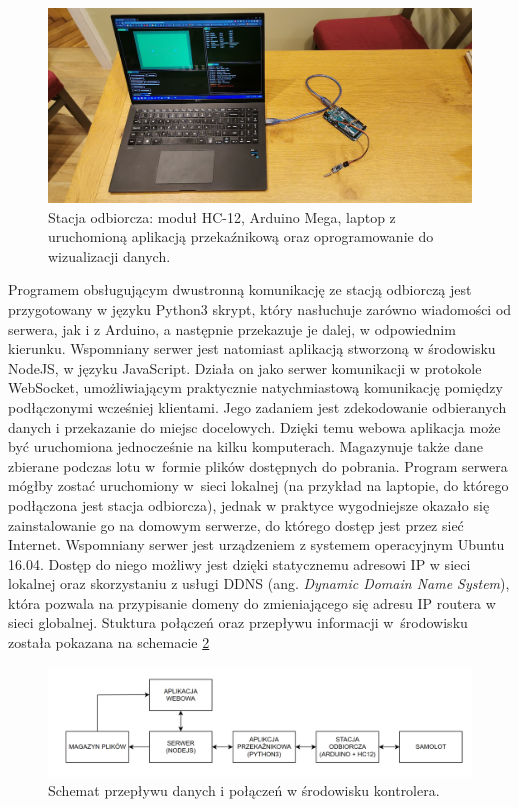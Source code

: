 \documentclass[12pt, a4paper]{article}
\begin{document}
 \begin{figure}[ht]
    \centering
    \includegraphics[width=1\textwidth]{baza}
    \caption{Stacja odbiorcza: moduł HC-12, Arduino Mega, laptop z uruchomioną aplikacją przekaźnikową oraz oprogramowanie do wizualizacji danych.}
    \label{fig:baza}
\end{figure}

Programem obsługującym dwustronną komunikację ze stacją odbiorczą jest przygotowany w języku Python3 skrypt, który nasłuchuje zarówno wiadomości od serwera, jak i z Arduino, a następnie przekazuje je dalej, w odpowiednim kierunku. Wspomniany serwer jest natomiast aplikacją stworzoną w środowisku NodeJS, w języku JavaScript. Działa on jako serwer komunikacji w protokole WebSocket, umożliwiającym praktycznie natychmiastową komunikację pomiędzy podłączonymi wcześniej klientami. Jego zadaniem jest zdekodowanie odbieranych danych i przekazanie do miejsc docelowych. Dzięki temu webowa aplikacja może być uruchomiona jednocześnie na kilku komputerach. Magazynuje także dane zbierane podczas lotu w~formie plików dostępnych do pobrania. Program serwera mógłby zostać uruchomiony w~sieci lokalnej (na przykład na laptopie, do którego podłączona jest stacja odbiorcza), jednak w praktyce wygodniejsze okazało się zainstalowanie go na domowym serwerze, do którego dostęp jest przez sieć Internet. Wspomniany serwer jest urządzeniem z systemem operacyjnym Ubuntu 16.04. Dostęp do niego możliwy jest dzięki statycznemu adresowi IP w sieci lokalnej oraz skorzystaniu z usługi DDNS (ang. \textit{Dynamic Domain Name System}), która pozwala na przypisanie domeny do zmieniającego się adresu IP routera w sieci globalnej. Stuktura połączeń oraz przepływu informacji w~środowisku została pokazana na schemacie \ref{fig:env}

 \begin{figure}[ht]
    \centering
    \includegraphics[width=1\textwidth]{diagram_env}
    \caption{Schemat przepływu danych i połączeń w środowisku kontrolera.}
    \label{fig:env}
\end{figure}
\end{document}
